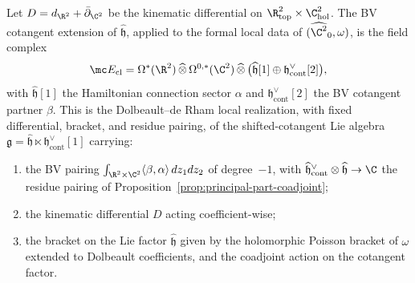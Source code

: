 \documentclass[11pt]{memoir}
\begin{document}
\begin{thm}\label{thm:closed-bv-canonical-transformation}
  Let $D=d_{\R^2}+\bar\partial_{\C^2}$ be the kinematic differential on
  $\R^2_{\mathrm{top}}\times\C^2_{\mathrm{hol}}$.  The BV cotangent
  extension of $\widehat{\mathfrak h}$, applied to the formal local
  data of $(\widehat{\C^2}_0,\omega)$, is the field complex
  \begin{equation}\label{eq:closed-BV-field-complex}
  \mc E_{\mathrm{cl}}
    =\Omega^*(\R^2)\,\widehat\otimes\,\Omega^{0,*}(\C^2)\,
      \widehat\otimes\,
      \bigl(\widehat{\mathfrak h}[1]\oplus
        \mathfrak h^\vee_{\mathrm{cont}}[2]\bigr),
  \end{equation}
  with $\widehat{\mathfrak h}[1]$ the Hamiltonian connection sector
  $\alpha$ and $\mathfrak h^\vee_{\mathrm{cont}}[2]$ the BV cotangent
  partner $\beta$.  This is the Dolbeault--de Rham local realization,
  with fixed differential, bracket, and residue pairing, of the
  shifted-cotangent Lie algebra
  $\mathfrak g=\widehat{\mathfrak h}\ltimes\mathfrak h^\vee_{\mathrm{cont}}[1]$
  carrying:
  \begin{enumerate}[label=(\roman*)]
    \item the BV pairing
      $\int_{\R^2\times\C^2}\langle\beta,\alpha\rangle\,dz_1dz_2$ of
      degree~$-1$, with
      $\widehat{\mathfrak h}^\vee_{\mathrm{cont}}\otimes\widehat{\mathfrak h}\to\C$
      the residue pairing of
      Proposition~\ref{prop:principal-part-coadjoint};
    \item the kinematic differential $D$ acting coefficient-wise;
    \item the bracket on the Lie factor $\widehat{\mathfrak h}$ given by
      the holomorphic Poisson bracket of $\omega$ extended to Dolbeault
      coefficients, and the coadjoint action on the cotangent factor.
  \end{enumerate}
\end{thm}
\end{document}
